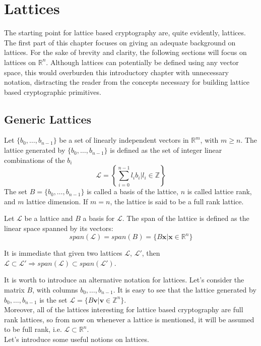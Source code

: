 \section{Lattices}

The starting point for lattice based cryptography are, quite evidently, lattices. The first part of this chapter focuses on giving an adequate background on lattices. For the sake of brevity and clarity, the following sections will focus on lattices on $\mathbb{R}^n$. Although lattices can potentially be defined using any vector space, this would overburden this introductory chapter with unnecessary notation, distracting the reader from the concepts necessary for building lattice based cryptographic primitives.

\subsection{Generic Lattices}

\begin{definition}[Lattice]
Let $\{b_0,\ldots,b_{n-1}\}$ be a set of linearly independent vectors in $\mathbb{R}^m$, with $m\geq n$. The lattice generated by $\{b_0,\ldots,b_{n-1}\}$ is defined as the set of integer linear combinations of the $b_i$
\begin{equation*}
\mathscr{L}=\left\{\sum_{i=0}^{n-1}l_ib_i | l_i\in\mathbb{Z}\right\}
\end{equation*}
The set $B=\{b_0,\ldots,b_{n-1}\}$ is called a basis of the lattice, $n$ is called lattice rank, and $m$ lattice dimension. If $m=n$, the lattice is said to be a full rank lattice.
\end{definition}

\begin{definition}
Let $\mathscr{L}$ be a lattice and $B$ a basis for $\mathscr{L}$. The span of the lattice is defined as the linear space spanned by its vectors:
\begin{equation*}
span(\mathscr{L}) = span(B) = \{B\mathbf{x}|\mathbf{x}\in\mathbb{R}^n\}
\end{equation*} 
\end{definition}

\begin{remark}
It is immediate that given two lattices $\mathscr{L}$, $\mathscr{L}'$, then $\mathscr{L}\subset \mathscr{L}' \Rightarrow span(\mathscr{L}) \subset span(\mathscr{L}')$.
\end{remark}

It is worth to introduce an alternative notation for lattices. Let's consider the matrix $B$, with columns $b_0,\ldots,b_{n-1}$. It is easy to see that the lattice generated by $b_0,\ldots,b_{n-1}$ is the set $\mathscr{L}=\{B\mathbf{v}|\mathbf{v}\in\mathbb{Z}^n\}$.\\
Moreover, all of the lattices interesting for lattice based cryptography are full rank lattices, so from now on whenever a lattice is mentioned, it will be assumed to be full rank, i.e. $\mathscr{L}\subset\mathbb{R}^n$.\\
Let's introduce some useful notions on lattices.

